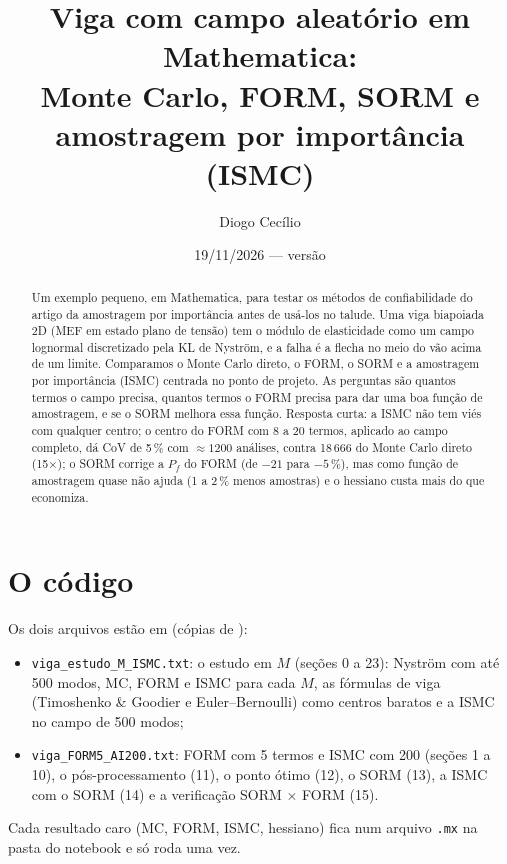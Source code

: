 \documentclass[11pt,a4paper]{article}
\title{Viga com campo aleatório em Mathematica:\\ Monte Carlo, FORM, SORM e amostragem por importância (ISMC)}
\author{Diogo Cecílio}
\date{19/11/2026 --- versão \versao}
\newcommand{\Pf}{P_f}
\begin{document}
\maketitle
\begin{abstract}
Um exemplo pequeno, em Mathematica, para testar os métodos de confiabilidade do artigo da amostragem por importância
antes de usá-los no talude. Uma viga biapoiada 2D (MEF em estado plano de tensão) tem o módulo de elasticidade como um
campo lognormal discretizado pela KL de Nyström, e a falha é a flecha no meio do vão acima de um limite. Comparamos o
Monte Carlo direto, o FORM, o SORM e a amostragem por importância (ISMC) centrada no ponto de projeto. As perguntas são
quantos termos o campo precisa, quantos termos o FORM precisa para dar uma boa função de amostragem, e se o SORM melhora
essa função. Resposta curta: a ISMC não tem viés com qualquer centro; o centro do FORM com 8 a 20 termos, aplicado ao
campo completo, dá CoV de 5\,\% com $\approx 1200$ análises, contra 18\,666 do Monte Carlo direto (15$\times$); o SORM
corrige a $\Pf$ do FORM (de $-21$ para $-5\,\%$), mas como função de amostragem quase não ajuda (1 a 2\,\% menos
amostras) e o hessiano custa mais do que economiza.
\end{abstract}
\tableofcontents

\section{O código}
Os dois arquivos estão em  (cópias de ):
\begin{itemize}
  \item \texttt{viga\_estudo\_M\_ISMC.txt}: o estudo em $M$ (seções 0 a 23): Nyström com até 500 modos, MC, FORM e ISMC
    para cada $M$, as fórmulas de viga (Timoshenko \& Goodier e Euler--Bernoulli) como centros baratos e a ISMC no campo de
    500 modos;
  \item \texttt{viga\_FORM5\_AI200.txt}: FORM com 5 termos e ISMC com 200 (seções 1 a 10), o pós-processamento (11), o
    ponto ótimo (12), o SORM (13), a ISMC com o SORM (14) e a verificação SORM $\times$ FORM (15).
\end{itemize}
Cada resultado caro (MC, FORM, ISMC, hessiano) fica num arquivo \texttt{.mx} na pasta do notebook e só roda uma vez.
\end{document}
